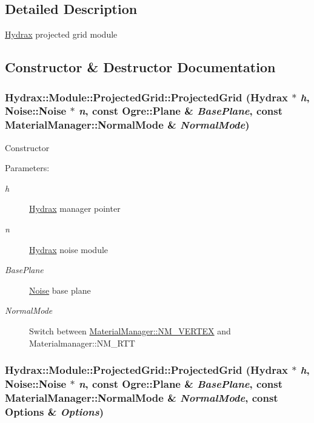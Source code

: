 \subsection{Detailed Description}
\hyperlink{class_hydrax_1_1_hydrax}{Hydrax} projected grid module 

\subsection{Constructor \& Destructor Documentation}
\hypertarget{class_hydrax_1_1_module_1_1_projected_grid_ccda1b1a4c84e3da9b8a96e7dcb69a27}{
\subsubsection[{ProjectedGrid}]{\setlength{\rightskip}{0pt plus 5cm}Hydrax::Module::ProjectedGrid::ProjectedGrid ({\bf Hydrax} $\ast$ {\em h}, \/  {\bf Noise::Noise} $\ast$ {\em n}, \/  const Ogre::Plane \& {\em BasePlane}, \/  const {\bf MaterialManager::NormalMode} \& {\em NormalMode})}}
\label{class_hydrax_1_1_module_1_1_projected_grid_ccda1b1a4c84e3da9b8a96e7dcb69a27}


Constructor \begin{Desc}
\item[Parameters:]
\begin{description}
\item[{\em h}]\hyperlink{class_hydrax_1_1_hydrax}{Hydrax} manager pointer \item[{\em n}]\hyperlink{class_hydrax_1_1_hydrax}{Hydrax} noise module \item[{\em BasePlane}]\hyperlink{namespace_hydrax_1_1_noise}{Noise} base plane \item[{\em NormalMode}]Switch between \hyperlink{class_hydrax_1_1_material_manager_aa14689cd1c259f48954dfecda9b296ffe4d6257f673cf503a9905fb2576288f}{MaterialManager::NM\_\-VERTEX} and Materialmanager::NM\_\-RTT \end{description}
\end{Desc}
\hypertarget{class_hydrax_1_1_module_1_1_projected_grid_a9308990b99866cbd09edd3600972443}{
\subsubsection[{ProjectedGrid}]{\setlength{\rightskip}{0pt plus 5cm}Hydrax::Module::ProjectedGrid::ProjectedGrid ({\bf Hydrax} $\ast$ {\em h}, \/  {\bf Noise::Noise} $\ast$ {\em n}, \/  const Ogre::Plane \& {\em BasePlane}, \/  const {\bf MaterialManager::NormalMode} \& {\em NormalMode}, \/  const {\bf Options} \& {\em Options})}}
\label{class_hydrax_1_1_module_1_1_projected_grid_a9308990b99866cbd09edd3600972443}


